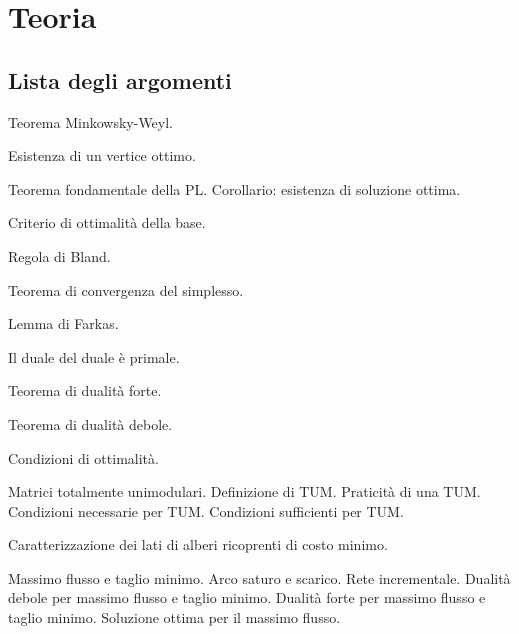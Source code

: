 \documentclass[\main/main.tex]{subfiles}
\begin{document}
\chapter{Teoria}

\section*{Lista degli argomenti}
\begin{todolist}
  \item Teorema Minkowsky-Weyl.
  \item Esistenza di un vertice ottimo.
  \item Teorema fondamentale della PL.
  \subitem Corollario: esistenza di soluzione ottima.
  \item Criterio di ottimalità della base.
  \item Regola di Bland.
  \item Teorema di convergenza del simplesso.
  \item Lemma di Farkas.
  \item Il duale del duale è primale.
  \item Teorema di dualità forte.
  \item Teorema di dualità debole.
  \item Condizioni di ottimalità.
  \item Matrici totalmente unimodulari.
  \subitem Definizione di TUM.
  \subitem Praticità di una TUM.
  \subitem Condizioni necessarie per TUM.
  \subitem Condizioni sufficienti per TUM.
  \item Caratterizzazione dei lati di alberi ricoprenti di costo minimo.
  \item Massimo flusso e taglio minimo.
  \subitem Arco saturo e scarico.
  \subitem Rete incrementale.
  \subitem Dualità debole per massimo flusso e taglio minimo.
  \subitem Dualità forte per massimo flusso e taglio minimo.
  \subitem Soluzione ottima per il massimo flusso.
\end{todolist}

\clearpage



\clearpage


\clearpage


\clearpage





\clearpage

\clearpage

\clearpage

\end{document}
